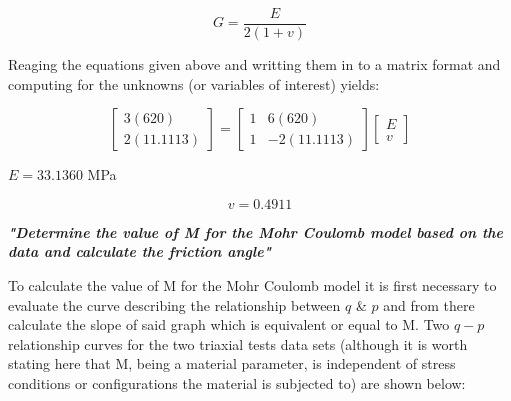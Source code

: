 \documentclass{article}
\begin{document}
\begin{par}
$$G=\frac{E}{2(1+v)}$$
\end{par}

\begin{par}
\begin{flushleft}
Reaging the equations given above and writting them in to a matrix format and computing for the unknowns (or variables of interest) yields:
\end{flushleft}
\end{par}

\begin{par}
$$\left[\begin{matrix} 3(620) \\ 2(11.1113)\end{matrix}\right]=\left[\begin{matrix} 1 & 6(620) \\ 1 & -2(11.1113) \end{matrix}\right]\left[\begin{matrix} E \\ v \end{matrix}\right]$$
\end{par}

\begin{par}
\begin{center}
$E=33.1360$ MPa
\end{center}
\end{par}

\begin{par}
$$v=0.4911$$
\end{par}


\label{H_053EAB94}

\begin{par}
\begin{flushleft}
\textit{\textbf{"Determine the value of M for the Mohr Coulomb model based on the data and calculate the friction angle"  }}
\end{flushleft}
\end{par}

\begin{par}
\begin{flushleft}
To calculate the value of M for the Mohr Coulomb model it is first necessary to evaluate the curve describing the relationship between $q$ \& $p$ and from there calculate the slope of said graph which is equivalent or equal to M. Two $q-p$ relationship curves for the two triaxial tests data sets (although it is worth stating here that M, being a material parameter, is independent of stress conditions or configurations the material is subjected to) are shown below: 
\end{flushleft}
\end{par}
\end{document}
